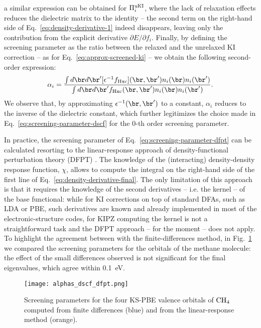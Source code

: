 %
a similar expression can be obtained for $\Pi_i^{\rm uKI}$, where the lack of relaxation effects reduces the dielectric matrix to the identity -- the second term on the right-hand side of Eq.~\eqref{eq:density-derivative-1} indeed disappears, leaving only the contribution from the explicit derivative $\partial E / \partial f_i$. Finally, by defining the screening parameter as the ratio between the relaxed and the unrelaxed KI correction -- as for Eq.~\eqref{eq:approx-screened-ki} -- we obtain the following second-order expression:
%
\begin{equation}
    \alpha_i = \frac{\int d\br d\br' [\epsilon^{-1} f_{\rm Hxc}](\br,\br') n_i(\br) n_i(\br')}{\int d\br d\br' f_{\rm Hxc}(\br,\br') n_i(\br) n_i(\br')} .
    \label{eq:screening-parameter-dfpt}
\end{equation}
%
We observe that, by approximating $\epsilon^{-1}(\br,\br')$ to a constant, $\alpha_i$ reduces to the inverse of the dielectric constant, which further legitimizes the choice made in Eq.~\eqref{eq:screening-parameter-dscf} for the 0-th order screening parameter.

In practice, the screening parameter of Eq.~\eqref{eq:screening-parameter-dfpt} can be calculated resorting to the linear-response approach of density-functional perturbation theory (DFPT) \cite{colonna_screening_2018}. The knowledge of the (interacting) density-density response function, $\chi$, allows to compute the integral on the right-hand side of the first line of Eq.~\eqref{eq:density-derivative-final}. The only limitation of this approach is that it requires the knowledge of the second derivatives -- i.e. the kernel -- of the base functional: while for KI corrections on top of standard DFAs, such as LDA or PBE, such derivatives are known and already implemented in most of the electronic-structure codes, for KIPZ computing the kernel is not a straightforward task and the DFPT approach -- for the moment -- does not apply. To highlight the agreement between with the finite-differences method, in Fig.~\ref{fig:alphas-dscf-dfpt} we compared the screening parameters for the orbitals of the methane molecule: the effect of the small differences observed is not significant for the final eigenvalues, which agree within 0.1~eV. 

\begin{figure}
    \centering
    \texttt{[image: alphas\_dscf\_dfpt.png]}
    \caption[Comparison of screening parameters from $\Delta$SCF and DFPT]{Screening parameters for the four KS-PBE valence orbitals of ${\rm CH}_4$ computed from finite differences (blue) and from the linear-response method (orange).}
    \label{fig:alphas-dscf-dfpt}
\end{figure}

